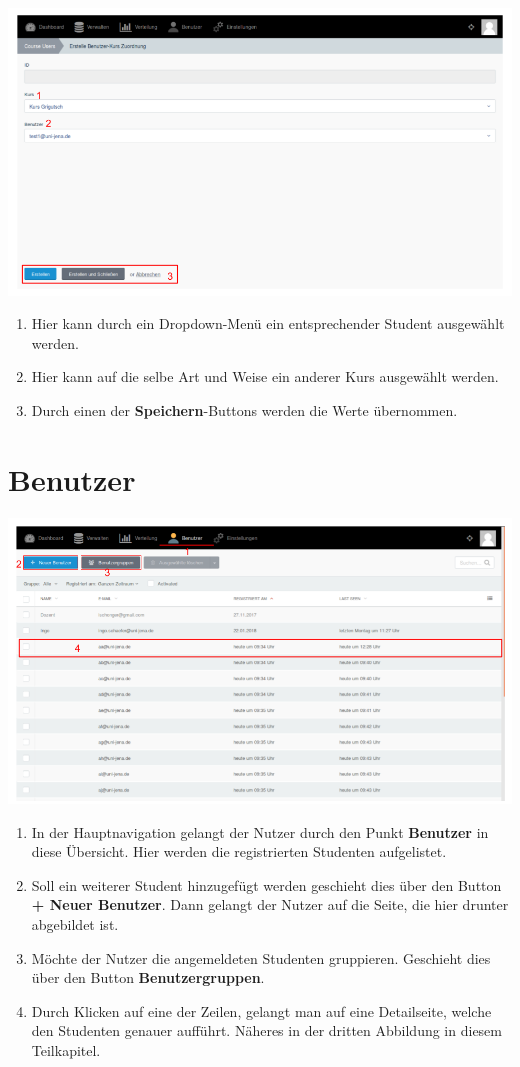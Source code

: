   
  \includegraphics[scale=0.3]{backend/img/distribution_5.png}
  \begin{enumerate}
   \item Hier kann durch ein Dropdown-Menü ein entsprechender Student ausgewählt werden.
   \item Hier kann auf die selbe Art und Weise ein anderer Kurs ausgewählt werden.
   \item Durch einen der \textbf{Speichern}-Buttons werden die Werte übernommen.
  \end{enumerate}

  \section{Benutzer}
  \label{section:users}
  
  \includegraphics[scale=0.3]{backend/img/users_1.png}
  \begin{enumerate}
   \item In der Hauptnavigation gelangt der Nutzer durch den Punkt \textbf{Benutzer} in diese Übersicht.
	 Hier werden die registrierten Studenten aufgelistet.
   \item Soll ein weiterer Student hinzugefügt werden geschieht dies über den Button \textbf{+ Neuer Benutzer}.
	 Dann gelangt der Nutzer auf die Seite, die hier drunter abgebildet ist.
   \item Möchte der Nutzer die angemeldeten Studenten gruppieren. Geschieht dies über den Button \textbf{Benutzergruppen}.
   \item Durch Klicken auf eine der Zeilen, gelangt man auf eine Detailseite, welche den Studenten genauer aufführt.
	 Näheres in der dritten Abbildung in diesem Teilkapitel.
  \end{enumerate}

